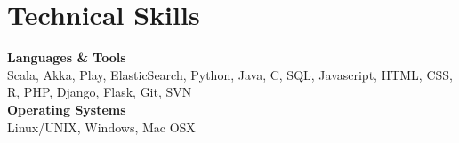 \documentclass[letterpaper]{article}
\begin{document}
  \section{Technical Skills}

    \noindent\textbf{Languages \& Tools} \\
    Scala, Akka, Play, ElasticSearch, Python, Java, C, SQL, Javascript, HTML, CSS, R, PHP, Django, Flask, Git, SVN \\

    \noindent\textbf{Operating Systems} \\
    Linux/UNIX, Windows, Mac OSX


\end{document}
